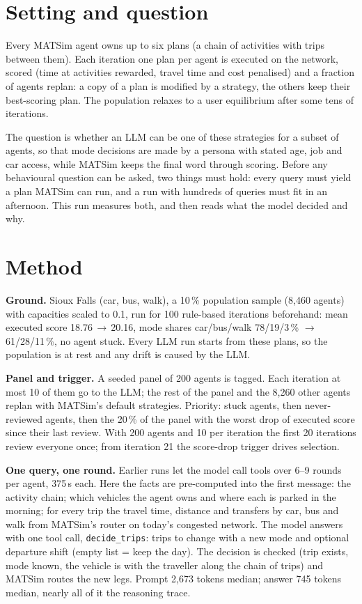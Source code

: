\documentclass[10pt,a4paper]{article}
\begin{document}
\section{Setting and question}
Every MATSim agent owns up to six plans (a chain of activities with trips between them). Each iteration one plan per agent is executed on the network, scored (time at activities rewarded, travel time and cost penalised) and a fraction of agents replan: a copy of a plan is modified by a strategy, the others keep their best-scoring plan. The population relaxes to a user equilibrium after some tens of iterations.

The question is whether an LLM can be one of these strategies for a subset of agents, so that mode decisions are made by a persona with stated age, job and car access, while MATSim keeps the final word through scoring. Before any behavioural question can be asked, two things must hold: every query must yield a plan MATSim can run, and a run with hundreds of queries must fit in an afternoon. This run measures both, and then reads what the model decided and why.

\section{Method}
\textbf{Ground.} Sioux Falls (car, bus, walk), a 10\,\% population sample (8,460 agents) with capacities scaled to 0.1, run for 100 rule-based iterations beforehand: mean executed score 18.76\,$\rightarrow$\,20.16, mode shares car/bus/walk 78/19/3\,\% $\rightarrow$ 61/28/11\,\%, no agent stuck. Every LLM run starts from these plans, so the population is at rest and any drift is caused by the LLM.

\textbf{Panel and trigger.} A seeded panel of 200 agents is tagged. Each iteration at most 10 of them go to the LLM; the rest of the panel and the 8,260 other agents replan with MATSim's default strategies. Priority: stuck agents, then never-reviewed agents, then the 20\,\% of the panel with the worst drop of executed score since their last review. With 200 agents and 10 per iteration the first 20 iterations review everyone once; from iteration 21 the score-drop trigger drives selection.

\textbf{One query, one round.} Earlier runs let the model call tools over 6--9 rounds per agent, 375\,s each. Here the facts are pre-computed into the first message: the activity chain; which vehicles the agent owns and where each is parked in the morning; for every trip the travel time, distance and transfers by car, bus and walk from MATSim's router on today's congested network. The model answers with one tool call, \texttt{decide\_trips}: trips to change with a new mode and optional departure shift (empty list = keep the day). The decision is checked (trip exists, mode known, the vehicle is with the traveller along the chain of trips) and MATSim routes the new legs. Prompt 2,673 tokens median; answer 745 tokens median, nearly all of it the reasoning trace.
\end{document}
